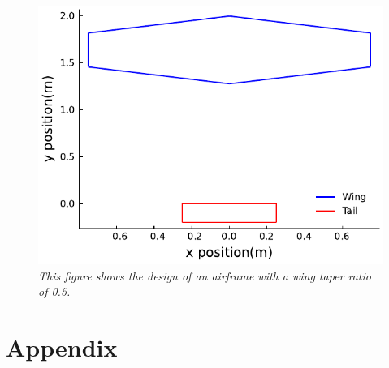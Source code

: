 \documentclass{journal}
\begin{document}
	\begin{figure}[H]
		\includegraphics{../graphics/taper_design.pdf}
		\caption{\emph{This figure shows the design of an airframe with a wing taper ratio of 0.5.}}
		\label{fig:taper_design}
	\end{figure}
	\newpage
	
	\section{Appendix}
	
\end{document}
